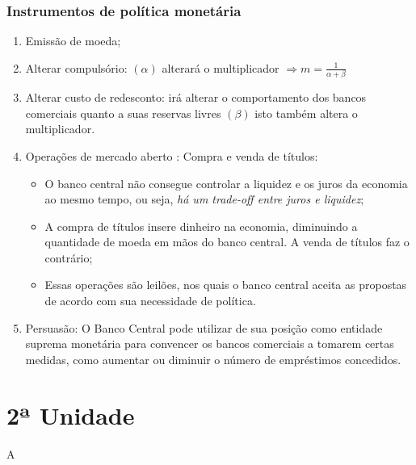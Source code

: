 \documentclass[12pt,a4paper,oneside,brazil]{abntex2}
\begin{document}
\subsection{Instrumentos de política monetária}
\begin{enumerate}
\item Emissão de moeda;
\item Alterar compulsório: $(\alpha)$ alterará o multiplicador $\Rightarrow m = \frac{1}{\alpha + \beta}$
\item Alterar custo de redesconto: irá alterar o comportamento dos bancos comerciais quanto a suas reservas livres $(\beta)$ isto também altera o multiplicador.
\item Operações de mercado aberto : Compra e venda de títulos:
\begin{itemize}
\item O banco central não consegue controlar a liquidez e os juros da economia ao mesmo tempo, ou seja, \emph{há um trade-off entre juros e liquidez};
\item A compra de títulos insere dinheiro na economia, diminuindo a quantidade de moeda em mãos do banco central. A venda de títulos faz o contrário;
\item Essas operações são leilões, nos quais o banco central aceita as propostas de acordo com sua necessidade de política.
\end{itemize}
\item Persuasão: O Banco Central pode utilizar de sua posição como entidade suprema monetária para convencer os bancos comerciais a tomarem certas medidas, como aumentar ou diminuir o número de empréstimos concedidos.
\end{enumerate}

\chapter{2ª Unidade}
A 
\printbibliography
\end{document}
